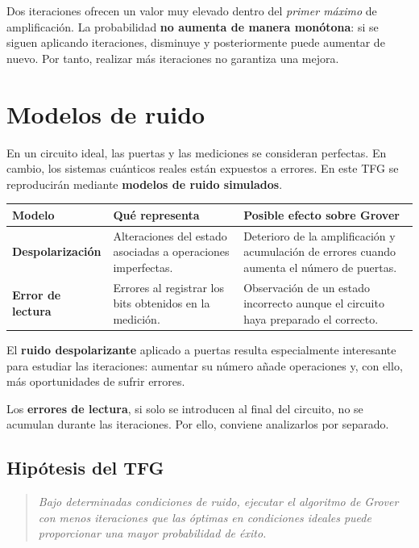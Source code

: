 \documentclass[11pt,a4paper]{article}
\begin{document}
Dos iteraciones ofrecen un valor muy elevado dentro del \emph{primer máximo} de amplificación. La probabilidad \textbf{no aumenta de manera monótona}: si se siguen aplicando iteraciones, disminuye y posteriormente puede aumentar de nuevo. Por tanto, realizar más iteraciones no garantiza una mejora.

\section{Modelos de ruido}

En un circuito ideal, las puertas y las mediciones se consideran perfectas. En cambio, los sistemas cuánticos reales están expuestos a errores. En este TFG se reproducirán mediante \textbf{modelos de ruido simulados}.

\begin{center}
\begin{tabularx}{\textwidth}{@{}>{\bfseries}p{3.0cm}X X@{}}
\toprule
Modelo & Qué representa & Posible efecto sobre Grover \\
\midrule
Despolarización & Alteraciones del estado asociadas a operaciones imperfectas. & Deterioro de la amplificación y acumulación de errores cuando aumenta el número de puertas. \\
Error de lectura & Errores al registrar los bits obtenidos en la medición. & Observación de un estado incorrecto aunque el circuito haya preparado el correcto. \\
\bottomrule
\end{tabularx}
\end{center}

El \textbf{ruido despolarizante} aplicado a puertas resulta especialmente interesante para estudiar las iteraciones: aumentar su número añade operaciones y, con ello, más oportunidades de sufrir errores.

Los \textbf{errores de lectura}, si solo se introducen al final del circuito, no se acumulan durante las iteraciones. Por ello, conviene analizarlos por separado.

\subsection{Hipótesis del TFG}

\begin{quote}
\emph{Bajo determinadas condiciones de ruido, ejecutar el algoritmo de Grover con menos iteraciones que las óptimas en condiciones ideales puede proporcionar una mayor probabilidad de éxito.}
\end{quote}
\end{document}
